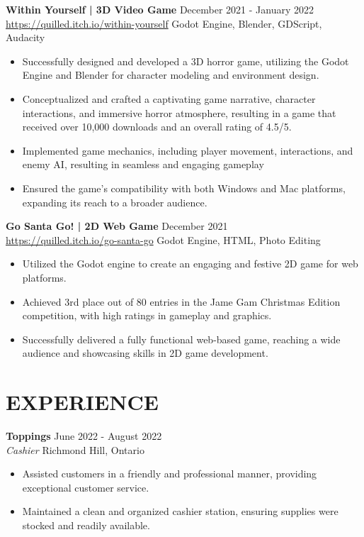 \documentclass[a4paper,10pt]{extarticle}
\begin{document}
\noindent
\textbf{Within Yourself | 3D Video Game} \hfill December 2021 - January 2022\\
\url{https://quilled.itch.io/within-yourself} \hfill Godot Engine, Blender, GDScript, Audacity
\begin{itemize}
	\item Successfully designed and developed a 3D horror game, utilizing the Godot
	      Engine and Blender for character modeling and environment design.
	\item Conceptualized and crafted a captivating game narrative, character interactions,
	      and immersive horror atmosphere, resulting in a game that received over 10,000 downloads and an overall rating of 4.5/5.
	\item Implemented game mechanics, including player movement, interactions, and
	      enemy AI, resulting in seamless and engaging gameplay
	\item Ensured the game's compatibility with both Windows and Mac platforms,
	      expanding its reach to a broader audience.
\end{itemize}


\noindent
\textbf{Go Santa Go! | 2D Web Game} \hfill December 2021\\
\url{https://quilled.itch.io/go-santa-go} \hfill Godot Engine, HTML, Photo Editing
\begin{itemize}
	\item Utilized the Godot engine to create an engaging and festive 2D game for web platforms.
	\item Achieved 3rd place out of 80 entries in the Jame Gam Christmas Edition competition, with high ratings in gameplay and graphics.
	\item Successfully delivered a fully functional web-based game, reaching a wide audience and showcasing skills in 2D game development.
\end{itemize}

\section*{EXPERIENCE}

\noindent
\textbf{Toppings} \hfill June 2022 - August 2022\\
\textit{Cashier} \hfill Richmond Hill, Ontario
\begin{itemize}
	\item Assisted customers in a friendly and professional manner, providing exceptional customer service.
	\item Maintained a clean and organized cashier station, ensuring supplies were stocked and readily available.
\end{itemize}
\end{document}
